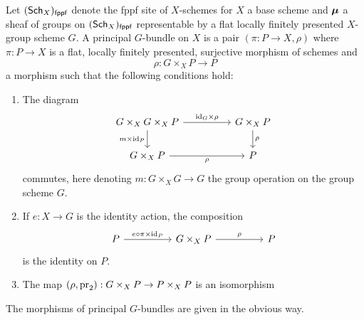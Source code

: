 \begin{definition}\label{def: principal G bundle}
    Let $(\mathsf{Sch}_{X})_{\mathsf{fppf}}$ denote the fppf site of $X$-schemes for $X$ a base scheme and $\bm{\mu}$ a sheaf of groups on $(\mathsf{Sch}_{X})_{\mathsf{fppf}}$ representable by a flat locally finitely presented $X$-group scheme $G$. A principal $G$-bundle on $X$ is a pair $(\pi:P\to X,\rho)$ where $\pi:P\to X$ is a flat, locally finitely presented, surjective morphism of schemes and 
    $$\rho:G\times_{X}P\to P$$
    a morphism such that the following conditions hold:
    \begin{enumerate}[label=(\alph*)]
        \item The diagram 
        $$%
        \begin{tikzcd}
            {G\times_{X}G\times_{X}P} && {G\times_{X}P} \\
            {G\times_{X}P} && P
            \arrow["\rho"', from=2-1, to=2-3]
            \arrow["\rho", from=1-3, to=2-3]
            \arrow["{\id_{G}\times\rho}", from=1-1, to=1-3]
            \arrow["{m\times\id_{P}}"', from=1-1, to=2-1]
        \end{tikzcd}$$
        commutes, here denoting $m:G\times_{X}G\to G$ the group operation on the group scheme $G$. 
        \item If $e:X\to G$ is the identity action, the composition 
        $$%
        \begin{tikzcd}
            P && {G\times_{X}P} && P
            \arrow["{e\circ\pi\times\id_{P}}", from=1-1, to=1-3]
            \arrow["\rho", from=1-3, to=1-5]
        \end{tikzcd}$$
        is the identity on $P$. 
        \item The map $(\rho,\mathrm{pr}_{2}):G\times_{X}P\to P\times_{X}P$ is an isomorphism 
    \end{enumerate}
\end{definition}
The morphisms of principal $G$-bundles are given in the obvious way. 
